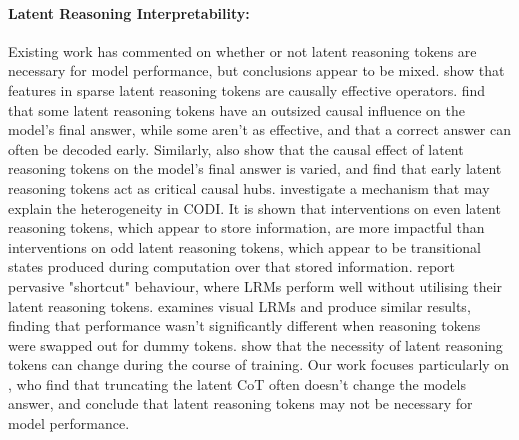 \documentclass[11pt]{article}
\begin{document}
\paragraph{Latent Reasoning Interpretability:} Existing work has commented on whether or not latent reasoning tokens are necessary for model performance, but conclusions appear to be mixed. \citet{wang2026beyond} show that features in sparse latent reasoning tokens are causally effective operators. \citet{li_dynamics_2026} find that some latent reasoning tokens have an outsized causal influence on the model's final answer, while some aren't as effective, and that a correct answer can often be decoded early. Similarly, \citet{aswal_observable_2026} also show that the causal effect of latent reasoning tokens on the model's final answer is varied, and \citet{chang_unlocking_2026} find that early latent reasoning tokens act as critical causal hubs. \citet{goyal2025scratchpad} investigate a mechanism that may explain the heterogeneity in CODI. 
It is shown that interventions on even latent reasoning tokens, which appear to store information, are more impactful than interventions on odd latent reasoning tokens, which appear to be transitional states produced during computation over that stored information. \citet{cui_how_2026} report pervasive "shortcut" behaviour, where LRMs perform well without utilising their latent reasoning tokens. \citet{viveiros_whats_2026} examines visual LRMs and produce similar results, finding that performance wasn't significantly different when reasoning tokens were swapped out for dummy tokens. \citet{jin_final_2026} show that the necessity of latent reasoning tokens can change during the course of training. Our work focuses particularly on \citet{dilgren2026latent}, who find that truncating the latent CoT often doesn't change the models answer, and conclude that latent reasoning tokens may not be necessary for model performance.

\end{document}
